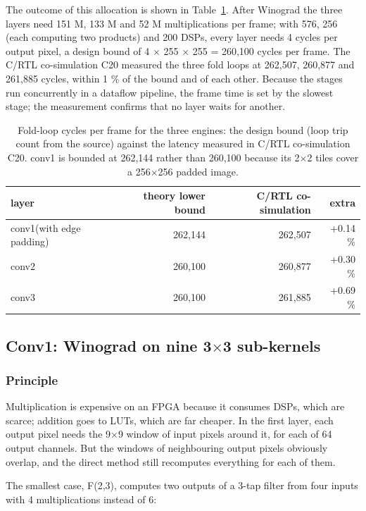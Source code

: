 The outcome of this allocation is shown in Table~\ref{tab:6}. After Winograd the three layers need 151 M, 133 M and 52 M multiplications per frame; with 576, 256 (each computing two products) and 200 DSPs, every layer needs 4 cycles per output pixel, a design bound of 4 $\times$ 255 $\times$ 255 = 260,100 cycles per frame. The C/RTL co-simulation C20 measured the three fold loops at 262,507, 260,877 and 261,885 cycles, within 1 \% of the bound and of each other. Because the stages run concurrently in a dataflow pipeline, the frame time is set by the slowest stage; the measurement confirms that no layer waits for another.

\begin{table}[!htbp]
\centering
\footnotesize
\caption{Fold-loop cycles per frame for the three engines: the design bound (loop trip count from the source) against the latency measured in C/RTL co-simulation C20. conv1 is bounded at 262,144 rather than 260,100 because its 2$\times$2 tiles cover a 256$\times$256 padded image.}
\label{tab:6}
\begin{tabular}{lrrr}
\toprule
layer & theory lower bound & C/RTL co-simulation & extra \\
\midrule
conv1(with edge padding) & 262,144 & 262,507 & +0.14 \% \\
conv2 & 260,100 & 260,877 & +0.30 \% \\
conv3 & 260,100 & 261,885 & +0.69 \% \\
\bottomrule
\end{tabular}
\end{table}

\subsection{Conv1: Winograd on nine 3$\times$3 sub-kernels}\label{sec:4.3}

\subsubsection{Principle}\label{sec:4.3.1}

Multiplication is expensive on an FPGA because it consumes DSPs, which are scarce; addition goes to LUTs, which are far cheaper. In the first layer, each output pixel needs the 9$\times$9 window of input pixels around it, for each of 64 output channels. But the windows of neighbouring output pixels obviously overlap, and the direct method still recomputes everything for each of them.

The smallest case, F(2,3), computes two outputs of a 3-tap filter from four inputs with 4 multiplications instead of 6:

